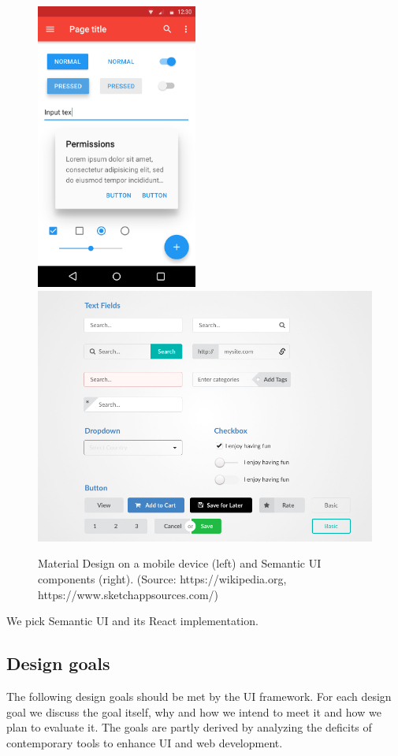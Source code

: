 \begin{figure}[!htb]
  \includegraphics[width=150pt]
    {images/materialdesign.png}
  \includegraphics[width=320pt]
    {images/semanticui.jpg}
  \caption{Material Design on a mobile device (left) and Semantic UI components (right). (Source: https://wikipedia.org, https://www.sketchappsources.com/)}
\end{figure}

We pick Semantic UI and its React implementation.

\subsection{Design goals}\label{sec:designgoals}
The following design goals should be met by the UI framework. For each design goal we discuss the goal itself, why and how we intend to meet it and how we plan to evaluate it.
The goals are partly derived by analyzing the deficits of contemporary tools to enhance UI and web development.

